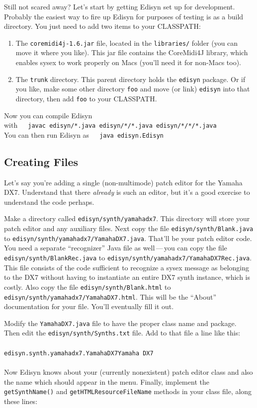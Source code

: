 \documentclass{article}
\begin{document}
Still not scared away? Let's start by getting Edisyn set up for development.  Probably the easiest way to fire up Edisyn for purposes of testing is as a build directory.  You just need to add two items to your CLASSPATH:

\begin{enumerate}
\item The {\tt coremidi4j-1.6.jar} file, located in the {\tt libraries/} folder (you can move it where you like).  This jar file contains the CoreMidi4J library, which enables sysex to work properly on Macs (you'll need it for non-Macs too).

\item The {\tt trunk} directory.  This parent directory holds the {\tt edisyn} package.  Or if you like, make some other directory {\tt foo} and move (or link) {\tt edisyn} into that directory, then add {\tt foo} to your CLASSPATH.
\end{enumerate}

Now you can compile Edisyn with\ \ \  {\tt javac~edisyn/*.java~edisyn/*/*.java~edisyn/*/*/*.java}\\
You can then run Edisyn as\ \ \  {\tt java edisyn.Edisyn}

\subsection{Creating Files}

Let's say you're adding a single (non-multimode) patch editor for the Yamaha DX7.  Understand that there {\it already} is such an editor, but it's a good exercise to understand the code perhaps.

Make a directory called {\tt edisyn/synth/yamahadx7}.  This directory will store your patch editor and any auxiliary files.  Next copy the file {\tt edisyn/synth/Blank.java} to {\tt edisyn/synth/yamahadx7/YamahaDX7.java}.  That'll be your patch editor code.  You need a separate ``recognizer'' Java file as well\,---\,you can copy the file {\tt edisyn/synth/BlankRec.java} to {\tt edisyn/synth/yamahadx7/YamahaDX7Rec.java}.  This file consists of the code sufficient to recognize a sysex message as belonging to the DX7 without having to instantiate an entire DX7 synth instance, which is costly.  Also copy the file {\tt edisyn/synth/Blank.html} to {\tt edisyn/synth/yamahadx7/YamahaDX7.html}.  This will be the ``About'' documentation for your file.  You'll eventually fill it out.

Modify the {\tt YamahaDX7.java} file to have the proper class name and package.  Then edit the {\tt edisyn/synth/Synths.txt} file.  Add to that file a line like this:\\
\\
{\tt edisyn.synth.yamahadx7.YamahaDX7\textit{\qquad[tab]\qquad}Yamaha DX7}\\
\\
Now Edisyn knows about your (currently nonexistent) patch editor class and also the name which should appear in the menu.  Finally, implement the {\tt getSynthName()} and {\tt getHTMLResourceFileName} methods in your class file, along these lines:
\end{document}
